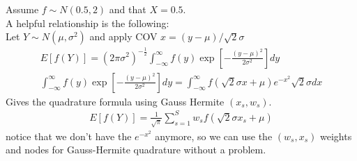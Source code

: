\documentclass{article}
\begin{document}
\noindent Assume $f \sim N(0.5,2)$ and that $X = 0.5$.\\


\noindent A helpful relationship is the following:\\

\noindent Let $Y\sim N(\mu,\sigma^2)$ and apply COV $x = (y-\mu)/\sqrt{2} \sigma$
\begin{eqnarray*}
E[f(Y)] = (2 \pi \sigma^2)^{-\frac{1}{2}} \int_{-\infty}^{\infty} f(y) \exp\left[-\frac{(y-\mu)^2}{2\sigma^2} \right] dy \\
\int_{-\infty}^{\infty} f(y) \exp\left[-\frac{(y-\mu)^2}{2\sigma^2} \right] dy = \int_{-\infty}^{\infty} f(\sqrt{2} \sigma x + \mu) e^{-x^2} \sqrt{2} \sigma dx
\end{eqnarray*}
Gives the quadrature formula using Gauss Hermite $(x_s,w_s)$.
\begin{eqnarray*}
E[f(Y)] = \frac{1}{\sqrt{\pi}} \sum_{s=1}^S w_s f(\sqrt{2}\sigma x_s+ \mu)
\end{eqnarray*}
notice that we don't have the $e^{-x^2}$ anymore, so we can use the $(w_s, x_s)$ weights and nodes for Gauss-Hermite quadrature without a problem.\\
\end{document}

